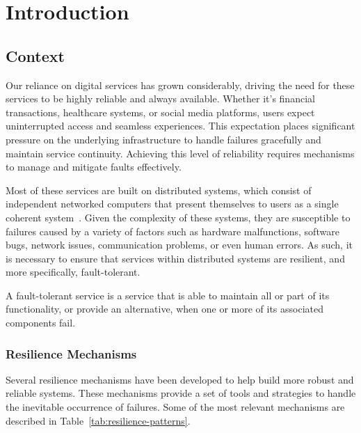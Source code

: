 \chapter{Introduction}\label{ch:introduction}


\section{Context}\label{sec:context}

Our reliance on digital services has grown considerably,
driving the need for these services to be highly reliable and always available.
Whether it's financial transactions, healthcare systems, or social media platforms, users expect uninterrupted access and seamless experiences.
This expectation places significant pressure on the underlying infrastructure to handle failures gracefully and maintain service continuity.
Achieving this level of reliability requires mechanisms to manage and mitigate faults effectively.

Most of these services are built on distributed systems,
which consist of independent networked computers that present themselves to users as a single coherent system~\cite{fcc-distributed-systems}.
Given the complexity of these systems, they are susceptible to failures caused by a variety of factors such as hardware malfunctions, software bugs, network issues, communication problems, or even human errors.
As such, it is necessary to ensure that services within distributed systems are resilient, and more specifically, fault-tolerant.

A fault-tolerant service is a service that is able to maintain all or part of its functionality,
or provide an alternative, when one or more of its associated components fail.

\subsection{Resilience Mechanisms}\label{subsec:resilience-mechanisms}

Several resilience mechanisms have been developed to help build more robust and reliable systems.
These mechanisms provide a set of tools and strategies to handle the inevitable occurrence of failures.
Some of the most relevant mechanisms are described in Table~\ref{tab:resilience-patterns}.

